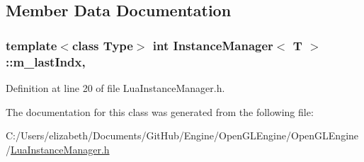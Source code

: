 \subsection{Member Data Documentation}
\subsubsection[{\texorpdfstring{m\+\_\+last\+Indx}{m_lastIndx}}]{\setlength{\rightskip}{0pt plus 5cm}template$<$class Type$>$ int {\bf Instance\+Manager}$<$ T $>$\+::m\+\_\+last\+Indx\hspace{0.3cm}{\ttfamily [static]}, {\ttfamily [private]}}\hypertarget{class_instance_manager_a2a5daf3836fbfe69acefd87064a974a2}{}\label{class_instance_manager_a2a5daf3836fbfe69acefd87064a974a2}


Definition at line 20 of file Lua\+Instance\+Manager.\+h.



The documentation for this class was generated from the following file\+:\begin{DoxyCompactItemize}
\item 
C\+:/\+Users/elizabeth/\+Documents/\+Git\+Hub/\+Engine/\+Open\+G\+L\+Engine/\+Open\+G\+L\+Engine/\hyperlink{_lua_instance_manager_8h}{Lua\+Instance\+Manager.\+h}\end{DoxyCompactItemize}

